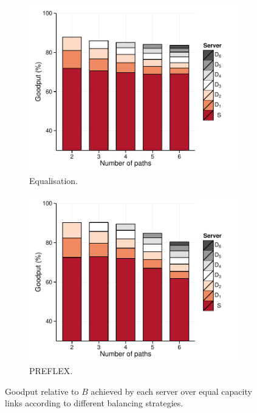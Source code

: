 \begin{figure}
    \centering
    \begin{subfigure}[b]{.5\linewidth}
        \centering
        \includegraphics[width=0.95\linewidth]{figures/cate/equal-equal}
        \caption{\label{eqeq}Equalisation.}
    \end{subfigure}%
    \begin{subfigure}[b]{.5\linewidth}
        \centering
        \includegraphics[width=0.95\linewidth]{figures/cate/preflex-equal}
        \caption{\label{preflexeq}PREFLEX.}
    \end{subfigure}
    \caption[Goodput achieved over equal capacity links.]{Goodput relative to $B$ achieved by each server over equal capacity links according to different balancing strategies.\label{fig:goodputeq}}
\end{figure}

